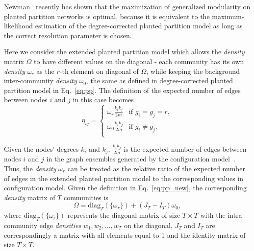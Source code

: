 Newman~\cite{newman2016equivalence} recently has shown that the maximization of generalized modularity on planted partition networks is optimal, because it is equivalent to the maximum-likelihood estimation of the degree-corrected planted partition model as long as the correct resolution parameter is chosen. 

Here we consider the extended planted partition model which allows the {\it density} matrix $\Omega$ to have different values on the diagonal - each community has its own {\it density} $\omega_r$ as the $r$-th element on diagonal of $\Omega$, while keeping the background inter-community {\it density} $\omega_0$, the same as defined in degree-corrected planted partition model in Eq.~\ref{eq:pp}. The definition of the expected number of edges between nodes $i$ and $j$ in this case becomes
\begin{equation} \label{eq:pp_new}
\eta_{ij} = 
    \begin{cases}
        \omega_r \frac{k_i k_j}{2m}  & \text{if  } g_i = g_j = r,  \\
        \omega_0 \frac{k_i k_j}{2m} & \text{if  } g_i \neq g_j. \\
    \end{cases}
\end{equation}

Given the nodes' degrees $k_i$ and $k_j$, $\frac{k_i k_j}{2m}$ is the expected number of edges between nodes $i$ and $j$ in the graph ensembles generated by the configuration model~\cite{molloy1995critical}. Thus, the {\it density} $\omega_r$ can be treated as the relative ratio of the expected number of edges in the extended planted partition model to the corresponding values in configuration model. Given the definition in Eq.~\ref{eq:pp_new}, the corresponding {\it density} matrix of $T$ communities is
\begin{equation} \label{eq:density2}
    \Omega = \text{diag}_T \left(\{\omega_r\} \right) + \left(J_T - I_T\right)\omega_0,
\end{equation}
where $\text{diag}_T(\{\omega_r\})$ represents the diagonal matrix of size $T\times T$ with the intra-community edge {\it densities} $w_1,w_2,\dots,w_T$ on the diagonal, $J_T$ and $I_T$ are correspondingly a matrix with all elements equal to 1 and the identity matrix of size $T\times T$. 

